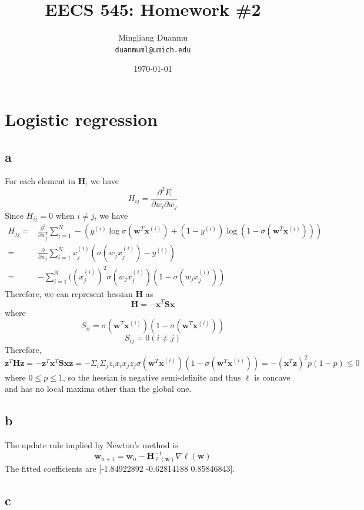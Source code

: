 \documentclass{article}
\title{EECS 545: Homework \#2} %
\author{Mingliang Duanmu\\ \texttt{duanmuml@umich.edu}} %
\date{\today} %
\begin{document}
\maketitle %

\section{Logistic regression}

\subsection*{a}

For each element in $\mathbf{H}$, we have
$$H_{ij} = \frac{\partial^2 E}{\partial w_i \partial w_j}$$
Since $H_{ij} = 0$ when $i \neq j$, we have
$$
\begin{aligned}
H_{jj} = & \frac{\partial^2}{\partial w_j^2}\sum_{i=1}^N -(y^{(i)}\log \sigma(\mathbf{w}^T\mathbf{x}^{(i)}) + (1 - y^{(i)})\log (1 - \sigma(\mathbf{w}^T\mathbf{x}^{(i)}))) \\
= & \frac{\partial}{\partial w_j} \sum_{i=1}^N x_j^{(i)} (\sigma(w_j x_j^{(i)}) - y^{(i)}) \\ 
= & -\sum_{i=1}^N((x_j^{(i)})^2\sigma (w_j x_j^{(i)})(1 - \sigma (w_j x_j^{(i)}))
\end{aligned}
$$
Therefore, we can represent hessian $\mathbf{H}$ as
$$\mathbf{H} = -\mathbf{x}^T\mathbf{S}\mathbf{x}$$
where
$$S_{ii} = \sigma(\mathbf{w}^T\mathbf{x}^{(i)}) (1 - \sigma(\mathbf{w}^T\mathbf{x}^{(i)}))$$
$$S_{ij} = 0 (i \neq j)$$
Therefore,
$$\mathbf{z}^T\mathbf{H}\mathbf{z} = -\mathbf{z}^T\mathbf{x}^T\mathbf{S}\mathbf{x}\mathbf{z} = -\Sigma_i \Sigma_j z_ix_ix_jz_j \sigma(\mathbf{w}^T\mathbf{x}^{(i)}) (1 - \sigma(\mathbf{w}^T\mathbf{x}^{(i)})) = -(\mathbf{x}^T\mathbf{z})^2 p(1-p) \leq 0$$
where $0 \leq p \leq 1$, so the hessian is negative semi-definite and thus $\ell$ is concave and has no local maxima other than the global one.

\subsection*{b}

The update rule implied by Newton's method is
$$\mathbf{w}_{n+1} = \mathbf{w}_n - \mathbf{H}_{\ell(\mathbf{w})}^{-1} \nabla \ell(\mathbf{w})$$
The fitted coefficients are [-1.84922892 -0.62814188  0.85846843].

\newpage

\subsection*{c}
\end{document}
